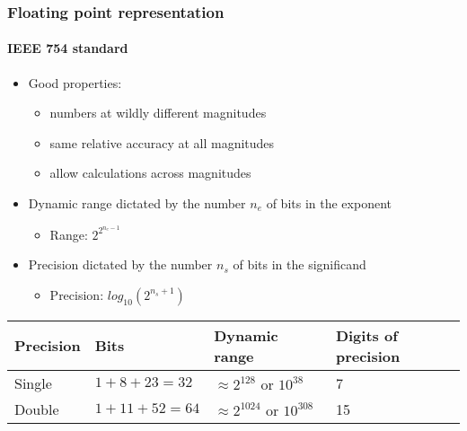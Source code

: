 \documentclass[9pt]{beamer}
\begin{document}
\begin{frame}
  \frametitle{Floating point representation}
  \framesubtitle{IEEE 754 standard}
  \begin{itemize}
  \item Good properties:
    \begin{itemize}
    \item numbers at wildly different magnitudes
    \item same relative accuracy at all magnitudes
    \item allow calculations across magnitudes
    \end{itemize}
  \item Dynamic range dictated by the number $n_e$ of bits in the exponent
    \begin{itemize}
    \item[] Range: $2^{2^{n_e - 1}}$
    \end{itemize}
  \item Precision dictated by the number $n_s$ of bits in the significand
    \begin{itemize}
    \item[] Precision: $log_{10} (2^{n_s + 1})$
    \end{itemize}
  \end{itemize}

  \bigskip

  \centering\begin{tabular}{llll}
    \hline
    Precision & Bits & Dynamic range & Digits of precision\\
    \hline
    \hline
    Single & $1 + 8 + 23 = 32$ & $\approx 2^{128} \text{ or } 10^{38}$ &
    7 \\
    Double & $1 + 11 + 52 = 64$ & $\approx 2^{1024} \text{ or } 10^{308}$ &
    15 \\
    \hline
  \end{tabular}
\end{frame}
\end{document}

